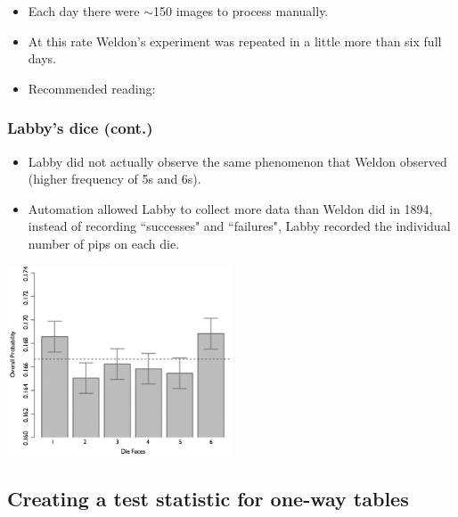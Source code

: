 \begin{frame}
\begin{itemize}

\item Each day there were $\sim$150 images to process manually.

\item At this rate Weldon's experiment was repeated in a little more than six full days.

\item Recommended reading: 

\end{itemize}

\end{frame}


\begin{frame}
\frametitle{Labby's dice (cont.)}

\begin{itemize}

\item Labby did not actually observe the same phenomenon that Weldon observed (higher frequency of 5s and 6s).

\item Automation allowed Labby to collect more data than Weldon did in 1894, instead of recording ``successes" and ``failures", Labby recorded the individual number of pips on each die.

\end{itemize}

\begin{center}
\includegraphics[width=0.5\textwidth]{6-3_chisq_gof/figures/dice/labbyPipCounts}
\end{center}

\end{frame}


\subsection*{Creating a test statistic for one-way tables}

